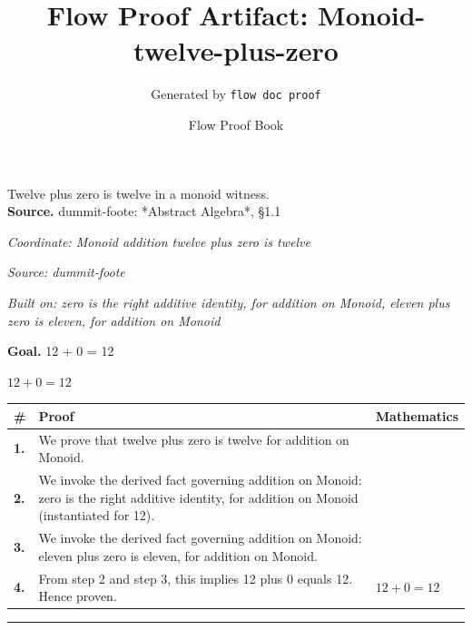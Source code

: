 \documentclass[11pt]{article}
\title{Flow Proof Artifact: Monoid-twelve-plus-zero}
\author{Generated by \texttt{flow doc proof}}
\date{Flow Proof Book}
\theoremstyle{definition}
\begin{document}
\maketitle
Twelve plus zero is twelve in a monoid witness.\\[0.5em]
\textbf{Source.} dummit-foote: *Abstract Algebra*, §1.1\\[0.5em]
\bigskip
{}\par
\smallskip\noindent\textit{Coordinate: Monoid \cdot addition \cdot twelve plus zero is twelve}\par
\smallskip\noindent\textit{Source: dummit-foote}\par
\smallskip\noindent\textit{Built on: zero is the right additive identity, for addition on Monoid, eleven plus zero is eleven, for addition on Monoid}\par
\medskip
\noindent\textbf{Goal.} 12 + 0 = 12\par
\noindent$\displaystyle 12 + 0 = 12$\par
\medskip
\noindent
\begin{tabular}{@{} >{\raggedright\arraybackslash}p{} >{\raggedright\arraybackslash}p{} >{\raggedleft\arraybackslash}p{} @{}}
\textbf{\#} & \textbf{Proof} & \textbf{Mathematics} \\
\midrule
\textbf{1.} & We prove that twelve plus zero is twelve for addition on Monoid. & \\[0.45em]
\textbf{2.} & We invoke the derived fact governing addition on Monoid: zero is the right additive identity, for addition on Monoid (instantiated for 12). & \\[0.45em]
\textbf{3.} & We invoke the derived fact governing addition on Monoid: eleven plus zero is eleven, for addition on Monoid. & \\[0.45em]
\textbf{4.} & From step 2 and step 3, this implies 12 plus 0 equals 12. Hence proven. & $\displaystyle 12 + 0 = 12$ \\[0.45em]
\bottomrule
\end{tabular}
\label{thm:Monoid-addition-twelve_plus_zero_is_twelve}
\par\medskip\hrule
\end{document}
